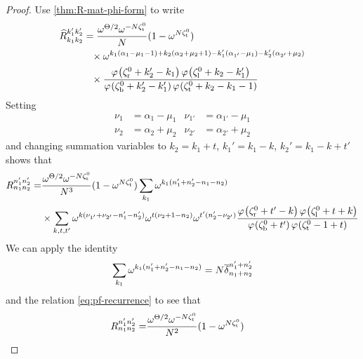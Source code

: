 \documentclass{sl2ams}
\numberwithin{equation}{section}
\begin{document}
\begin{proof}
Use \cref{thm:R-mat-phi-form} to write
\[
  \begin{aligned}
    \rmat{k_1}{k_2}{k_1'}{k_2'}
    &=
    \frac{
      \omega^{\Theta/2}
      \omega^{-\nr\zeta_{\lW}^0}
    }{
      \nr
    }
    (1 - \omega^{\nr \zeta_{\lW}^0})
    \\
    &\phantom{=}\times
    \omega^{
      k_1(\alpha_1-\mu_1 - 1)
      +
      k_2(\alpha_2 + \mu_2 + 1)
      -
      k_1' (\alpha_{1'} - \mu_{1})
      -
      k_2' (\alpha_{2'} + \mu_2)
    }
    \\
    &\phantom{=}\times
    \frac{
      \pf{\zeta_{\lN}^0 + k_2' - k_1}
      \pf{\zeta_{\lS}^0 + k_2 - k_1'}
      }{
        \pf{\zeta_{\lE}^0 + k_2' - k_1'}
        \pf{\zeta_{\lW}^0 + k_2 - k_1 - 1}
    }
  \end{aligned}
\]
Setting
\begin{align*}
  \nu_{1}
    &=
    \alpha_1 - \mu_1
    &
    \nu_{1'}
    &=
    \alpha_{1'} - \mu_1
    \\
    \nu_{2}
    &=
    \alpha_2 + \mu_2
    &
    \nu_{2'}
    &=
    \alpha_{2'} + \mu_2
\end{align*}
and changing summation variables to \(k_2 = k_1 + t\), \(k_1' = k_1 - k\), \(k_2' = k_1 - k + t'\) shows that
\begin{equation}
  \begin{aligned}
    R_{n_1 n_2}^{n_1' n_2'}
    =
    &
    {}
    \frac{
      \omega^{\Theta/2}
      \omega^{-\nr\zeta_{\lW}^0}
    }{
      \nr^{3}
    }
    (1 - \omega^{\nr \zeta_{\lW}^0})
    \sum_{k_1}
    \omega^{k_1(n_1' + n_2' -n_1 -n_2)}
    \\
    &\times
    \sum_{k, t, t'}
    \omega^{k(\nu_{1'} + \nu_{2'} - n_1' - n_2')}
    \omega^{t(\nu_2 + 1 - n_2)}
    \omega^{t'(n_2' - \nu_{2'})}
    \frac{
      \pf{\zeta_{\lN}^0 + t' - k}
      \pf{\zeta_{\lS}^0 + t + k}
      }{
      \pf{\zeta_{\lE}^0 + t'}
      \pf{\zeta_{\lW}^0 - 1 + t}
    }
  \end{aligned}
\end{equation}
We can apply the identity
\[
  \sum_{k_1}
  \omega^{k_1(n_1' + n_2' -n_1 -n_2)}
  =
  N \overline{\delta}_{n_1 + n_2}^{n_1' +  n_2'}
\]
and the relation \eqref{eq:pf-recurrence} to see that
\begin{equation}
  \begin{aligned}
    R_{n_1 n_2}^{n_1' n_2'}
    =
    &
    {}
    \frac{
      \omega^{\Theta/2}
      \omega^{-\nr\zeta_{\lW}^0}
    }{
      \nr^{2}
    }
    (1 - \omega^{\nr\zeta_{\lW}^0})

\end{aligned}
\end{equation}
\end{proof}
\end{document}
